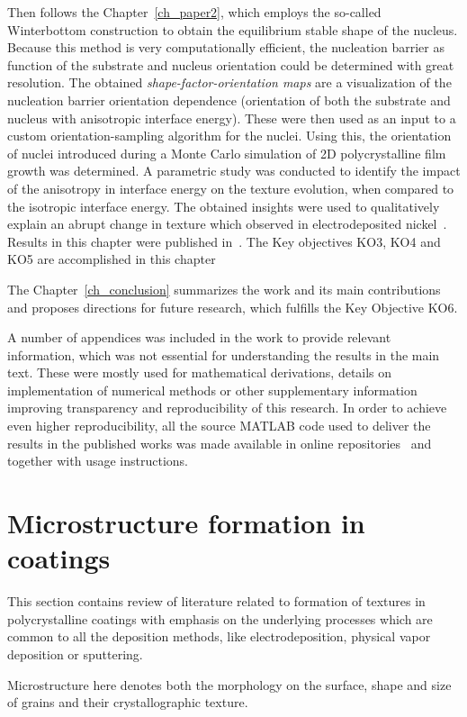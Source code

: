 Then follows the Chapter~\ref{ch_paper2}, which employs the so-called Winterbottom construction to obtain the equilibrium stable shape of the nucleus. Because this method is very computationally efficient, the nucleation barrier as function of the substrate and nucleus orientation could be determined with great resolution. The obtained \textit{shape-factor-orientation maps} are a visualization of the nucleation barrier orientation dependence (orientation of both the substrate and nucleus with anisotropic interface energy). These were then used as an input to a custom orientation-sampling algorithm for the nuclei. Using this, the orientation of nuclei introduced during a Monte Carlo simulation of 2D polycrystalline film growth was determined. A parametric study was conducted to identify the impact of the anisotropy in interface energy on the texture evolution, when compared to the isotropic interface energy. The obtained insights were used to qualitatively explain an abrupt change in texture which observed in electrodeposited nickel~\cite{Alimadadi2016}. Results in this chapter were published in~\cite{Minar2024}. The Key objectives KO3, KO4 and KO5 are accomplished in this chapter

The Chapter~\ref{ch_conclusion} summarizes the work and its main contributions and proposes directions for future research, which fulfills the Key Objective KO6.

A number of appendices was included in the work to provide relevant information, which was not essential for understanding the results in the main text. These were mostly used for mathematical derivations, details on implementation of numerical methods or other supplementary information improving transparency and reproducibility of this research. In order to achieve even higher reproducibility, all the source MATLAB code used to deliver the results in the published works was made available in online repositories~\cite{Minar2022dataset} and~\cite{Minar2023dataset} together with usage instructions.

\section{Microstructure formation in coatings}
This section contains review of literature related to formation of textures in polycrystalline coatings with emphasis on the underlying processes which are common to all the deposition methods, like electrodeposition, physical vapor deposition or sputtering. 

Microstructure here denotes both the morphology on the surface, shape and size of grains and their crystallographic texture.

